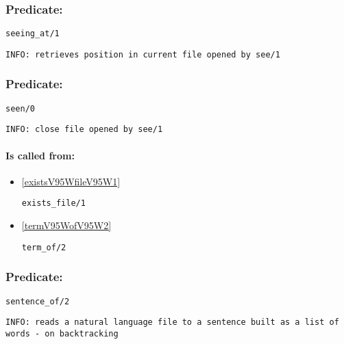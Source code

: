 \subsubsection{Predicate:} \label{seeingV95WatV95W1}

\begin{verbatim}
seeing_at/1
\end{verbatim}

{\small \begin{verbatim}
INFO: retrieves position in current file opened by see/1

\end{verbatim}}

\subsubsection{Predicate:} \label{seenV95W0}

\begin{verbatim}
seen/0
\end{verbatim}

{\small \begin{verbatim}
INFO: close file opened by see/1

\end{verbatim}}
\paragraph{Is called from:} 
\begin{itemize}
\item \ref{existsV95WfileV95W1} 
\begin{verbatim}
exists_file/1
\end{verbatim}

\item \ref{termV95WofV95W2} 
\begin{verbatim}
term_of/2
\end{verbatim}

\end{itemize}

\subsubsection{Predicate:} \label{sentenceV95WofV95W2}

\begin{verbatim}
sentence_of/2
\end{verbatim}

{\small \begin{verbatim}
INFO: reads a natural language file to a sentence built as a list of words - on backtracking

\end{verbatim}}
